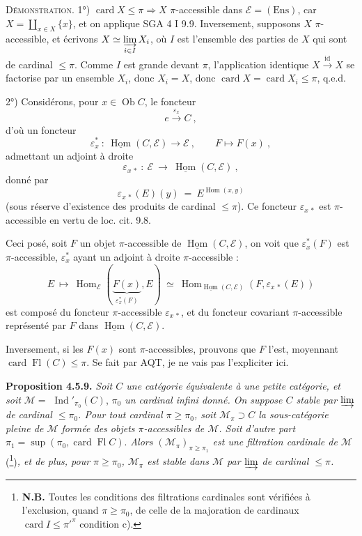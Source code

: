 \documentclass[11pt]{article}
\newcommand{\printedpage}[1]{\marginpar{\footnotesize p.~#1}}
\newcommand{\msp}[1]{\marginpar{\footnotesize [#1]}}
\newcommand{\Ob}{\operatorname{Ob}}
\newcommand{\card}{\operatorname{card}}
\newcommand{\Fl}{\operatorname{Fl}}
\newcommand{\Hom}{\operatorname{Hom}}
\newcommand{\uHom}{\underline{\operatorname{Hom}}}
\newcommand{\Ens}{\mathrm{Ens}}
\newcommand{\Ind}{\operatorname{Ind}}
\begin{document}
\textsc{Démonstration.} 1°) $\card X \leqslant \pi \Longrightarrow X$ $\pi$-accessible dans $\mathcal{E} = (\Ens)$, car $X = \coprod_{x \in X} \{x\}$, et on applique SGA 4 I 9.9. Inversement, supposons $X$ $\pi$-accessible, et écrivons $X \simeq \varinjlim\limits_{i \in I} X_i$, où $I$ est l'ensemble des parties de $X$ qui sont de cardinal $\leqslant \pi$. Comme $I$ est grande devant $\pi$, l'application identique $X \xrightarrow{\ \mathrm{id}\ } X$ se factorise par un ensemble $X_i$, donc $X_i = X$, donc $\card X = \card X_i \leqslant \pi$, q.e.d.

\msp{page 120}

2°) Considérons, pour $x \in \Ob C$, le foncteur
\[
e \xrightarrow{\ \varepsilon_x\ } C \ ,
\]
d'où un foncteur
\[
\varepsilon_x^* \ : \ \uHom(C,\mathcal{E}) \longrightarrow \mathcal{E} \ , \qquad F \longmapsto F(x) \ ,
\]
admettant un adjoint à droite
\[
\varepsilon_{x\,*} \ : \ \mathcal{E} \ \longrightarrow \ \uHom(C,\mathcal{E}) \ ,
\]
donné par
\[
\varepsilon_{x\,*}(E)(y) \ = \ E^{\Hom(x,y)}
\]
(sous réserve d'existence des produits de cardinal $\leqslant \pi$). Ce foncteur $\varepsilon_{x\,*}$ est $\pi$-accessible en vertu de loc. cit. 9.8.

Ceci posé, soit $F$ un objet $\pi$-accessible de $\uHom(C,\mathcal{E})$, on voit que $\varepsilon_x^*(F)$ est $\pi$-accessible, $\varepsilon_x^*$ ayant un adjoint à droite $\pi$-accessible :
\[
E \ \longmapsto \ \Hom_{\mathcal{E}}(\underbrace{F(x)}_{\varepsilon_x^*(F)}, E) \ \simeq \ \Hom_{\uHom(C,\mathcal{E})}(F, \varepsilon_{x\,*}(E))
\]
\printedpage{36}
est composé du foncteur $\pi$-accessible $\varepsilon_{x\,*}$, et du foncteur covariant $\pi$-accessible représenté par $F$ dans $\uHom(C,\mathcal{E})$.

Inversement, si les $F(x)$ sont $\pi$-accessibles, prouvons que $F$ l'est, moyennant $\card \Fl(C) \leqslant \pi$. Se fait par AQT, je ne vais pas l'expliciter ici.

\msp{page 121}

\textbf{Proposition 4.5.9.} \textit{Soit $C$ une catégorie équivalente à une petite catégorie, et soit $\mathcal{M} = $} $\Ind'_{\pi_0}(C)$, \textit{$\pi_0$ un cardinal infini donné. On suppose $C$ stable par $\varinjlim$ de cardinal $\leqslant \pi_0$. Pour tout cardinal $\pi \geqslant \pi_0$, soit $\mathcal{M}_\pi \supset C$ la sous-catégorie pleine de $\mathcal{M}$ formée des objets $\pi$-accessibles de $\mathcal{M}$. Soit d'autre part} $\pi_1 = \sup(\pi_0, \card \Fl C)$. \textit{Alors $(\mathcal{M}_\pi)_{\pi \geqslant \pi_1}$ est une filtration cardinale de $\mathcal{M}$} (\footnote{\textbf{N.B.} Toutes les conditions des filtrations cardinales sont vérifiées à l'exclusion, quand $\pi \geqslant \pi_0$, de celle de la majoration de cardinaux $\card I \leqslant \pi'^{\pi}$ condition c).})\textit{, et de plus, pour $\pi \geqslant \pi_0$, $\mathcal{M}_\pi$ est stable dans $\mathcal{M}$ par $\varinjlim$ de cardinal $\leqslant \pi$.}
\end{document}
